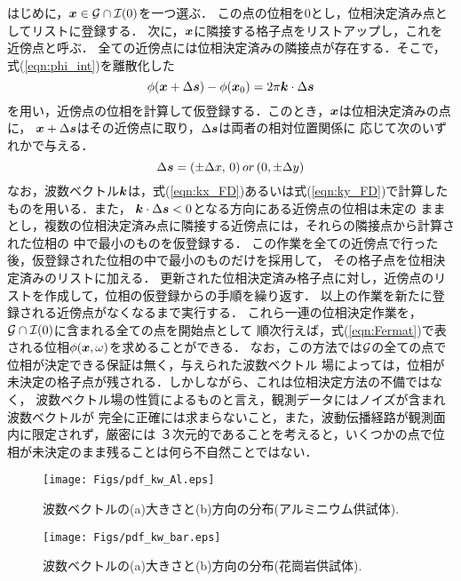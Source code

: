 はじめに，$\fat{x}\in {\cal G}\cap {\cal I}(0)$を一つ選ぶ．
この点の位相を0とし，位相決定済み点としてリストに登録する．
次に，$\mbox{\boldmath{$x$}}$に隣接する格子点をリストアップし，これを近傍点と呼ぶ．
全ての近傍点には位相決定済みの隣接点が存在する．そこで， 式(\ref{eqn:phi_int})を離散化した
\begin{equation}
	\phi(\fat{x}+\Delta \fat{s}) -\phi(\fat{x}_0) = 2\pi \fat{k} \cdot \Delta \fat{s}
	\label{eqn:inc_phase}
\end{equation}
を用い，近傍点の位相を計算して仮登録する．このとき，$\mbox{\boldmath{$x$}}$は位相決定済みの点に，
$\mbox{\boldmath{$x$}}+\Delta \mbox{\boldmath{$s$}}$はその近傍点に取り，$\Delta \mbox{\boldmath{$s$}}$は両者の相対位置関係に
応じて次のいずれかで与える．
\begin{equation}
	\Delta \fat{s} = (\pm \Delta x,\,0) \, or \, (0,\pm \Delta y)
	\label{eqn:}
\end{equation}
なお，波数ベクトル$\mbox{\boldmath{$k$}}$は，式(\ref{eqn:kx_FD})あるいは式(\ref{eqn:ky_FD})で計算した
ものを用いる．また， $\mbox{\boldmath{$k$}}\cdot \Delta \mbox{\boldmath{$s$}}<0$となる方向にある近傍点の位相は未定の
ままとし，複数の位相決定済み点に隣接する近傍点には，それらの隣接点から計算された位相の
中で最小のものを仮登録する．
この作業を全ての近傍点で行った後，仮登録された位相の中で最小のものだけを採用して，
その格子点を位相決定済みのリストに加える．
更新された位相決定済み格子点に対し，近傍点のリストを作成して，位相の仮登録からの手順を繰り返す．
以上の作業を新たに登録される近傍点がなくなるまで実行する．
これら一連の位相決定作業を，${\cal G}\cap {\cal I}(0)$に含まれる全ての点を開始点として
順次行えば，式(\ref{eqn:Fermat})で表される位相$\phi(\mbox{\boldmath{$x$}},\omega)$を求めることができる．
なお，この方法では$\cal G$の全ての点で位相が決定できる保証は無く，与えられた波数ベクトル
場によっては，位相が未決定の格子点が残される．しかしながら、これは位相決定方法の不備ではなく，
波数ベクトル場の性質によるものと言え，観測データにはノイズが含まれ波数ベクトルが
完全に正確には求まらないこと，また，波動伝播経路が観測面内に限定されず，厳密には
３次元的であることを考えると，いくつかの点で位相が未決定のまま残ることは何ら不自然ことではない．
\begin{figure}
\begin{center}
	\texttt{[image: Figs/pdf\_kw\_Al.eps]}
	\caption{波数ベクトルの(a)大きさと(b)方向の分布(アルミニウム供試体).}
	\label{fig:fig8}
\end{center}
\end{figure}
\begin{figure}
\begin{center}
	\texttt{[image: Figs/pdf\_kw\_bar.eps]}
	\caption{波数ベクトルの(a)大きさと(b)方向の分布(花崗岩供試体).}
	\label{fig:fig9}
\end{center}
\end{figure}
